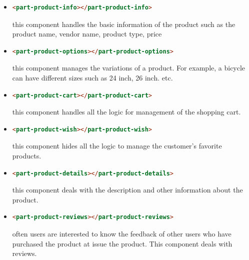 \begin{itemize}
\item
\begin{lstlisting}[language=html]
<part-product-info></part-product-info>
\end{lstlisting}
this component handles the basic information of the product such as the product name, vendor name, product type, price
\item
\begin{lstlisting}[language=html]
<part-product-options></part-product-options>
\end{lstlisting}
this component manages the variations of a product. For example, a bicycle can have different sizes such as 24 inch, 26 inch. etc.\item
\begin{lstlisting}[language=html]
<part-product-cart></part-product-cart>
\end{lstlisting}
this component handles all the logic for management of the shopping cart.
\item
\begin{lstlisting}[language=html]
<part-product-wish></part-product-wish>
\end{lstlisting}
this component hides all the logic to manage the customer's favorite products.
\item
\begin{lstlisting}[language=html]
<part-product-details></part-product-details>
\end{lstlisting}
this component deals with the description and other information about the product.
\item
\begin{lstlisting}[language=html]
<part-product-reviews></part-product-reviews>
\end{lstlisting}
often users are interested to know the feedback of other users who have purchased the product at issue the product. This component deals with reviews.
\end{itemize}